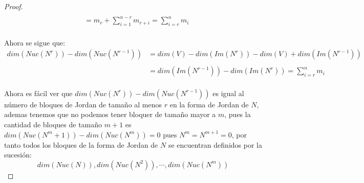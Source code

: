 \documentclass[11pt]{article}
\begin{document}
\begin{proof}
\begin{align*}
        \,\\
        &=m_r+\sum_{i=1}^{n-r}m_{r+i}=\sum_{i=r}^{n}m_{i}
    \end{align*}\,\\
    Ahora se sigue que:\,\\
    \begin{align*}
        dim(Nuc(N^r))-dim(Nuc(N^{r-1}))&=dim(V)-dim(Im(N^r))-dim(V)+dim(Im(N^{r-1}))\\
        \,\\
        &=dim(Im(N^{r-1}))-dim(Im(N^r))=\sum_{i=r}^{n}m_{i}
    \end{align*}\,\\
Ahora es f\'acil ver que $dim(Nuc(N^r))-dim(Nuc(N^{r-1}))$ es igual al n\'umero de bloques de Jordan de tama\~no al menos $r$ en la forma de Jordan de $N$, ademas tenemos que no podemos tener bloquer de tamaño mayor a $m$, pues la cantidad de bloques de tamaño $m+1$ es $dim(Nuc(N^m+1))-dim(Nuc(N^{m}))=0$ pues $N^m=N^{m+1}=0$, por tanto
todos los bloques de la forma de Jordan de $N$ se encuentran definidos por la sucesi\'on:
\begin{equation*}
    dim(Nuc(N)),dim(Nuc(N^2)),\cdots,dim(Nuc(N^m)) 
\end{equation*}
\end{proof}
\end{document}
